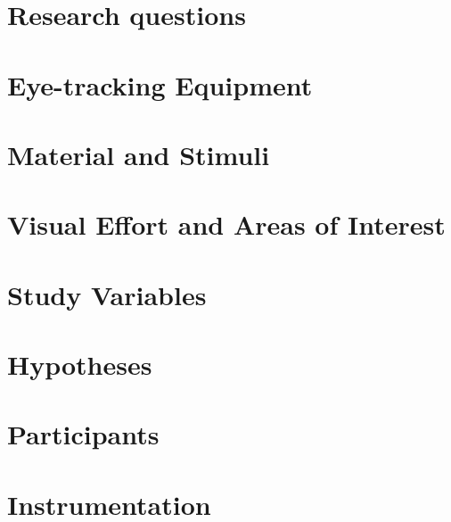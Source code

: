 \iffalse
\begin{itemize}
	\item How to measure simplicity and scalability
	\item Not just what you did but why and what the consequences are
\end{itemize}
Explore design space, motivate method, consequences, 
\fi

\section{Research questions}

\iffalse
I will attempt to replicate the 2010 study using an eye tracker device from tobii. I will set up a test process as similar to the original as I can, as to gather a minimum of the same amount of data. My aim is also to gather more data about the subjects that could act as confounding variables, such as what programming languages that they've used historically and currently, age gap, and other variables TBD (to be determined).

In the original test process subjects were instructed to observe an identifier on a screen, which was then replaced with another four identifiers. One of them matched the previous identifier, whereas the rest of them were incorrect, meant of distract the subject. The data that was then measured is the accuracy of the subject to identify the correct word, as well as the time it took to reach an answer. From the tobii eye tracker additional data such as time spent on each word, amount of fixations vs saccades (eye flicker), can be extracted.
Furthermore, data such as subject age, experience and background will be extracted in an interview like setting.
\fi

\section{Eye-tracking Equipment}

\section{Material and Stimuli}

\section{Visual Effort and Areas of Interest}

\section{Study Variables}

\section{Hypotheses}

\section{Participants}

\section{Instrumentation}